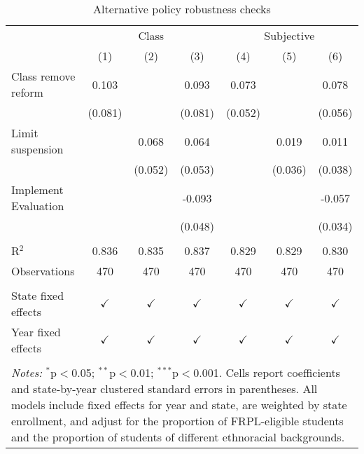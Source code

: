 
\begin{table}[!htbp]
   \centering
   \caption{\label{tab:alt} Alternative policy robustness checks}
   \begin{tabular}{lcccccc}
      \toprule
       & \multicolumn{3}{c}{Class} & \multicolumn{3}{c}{Subjective}\\
                           & (1)           & (2)           & (3)           & (4)           & (5)           & (6)\\
      \midrule 
      Class remove reform  & 0.103         &               & 0.093         & 0.073         &               & 0.078\\
                           & (0.081)       &               & (0.081)       & (0.052)       &               & (0.056)\\
      Limit suspension     &               & 0.068         & 0.064         &               & 0.019         & 0.011\\
                           &               & (0.052)       & (0.053)       &               & (0.036)       & (0.038)\\
      Implement Evaluation &               &               & -0.093        &               &               & -0.057\\
                           &               &               & (0.048)       &               &               & (0.034)\\
      \hline \\[-1.8ex]
      R$^2$                & 0.836         & 0.835         & 0.837         & 0.829         & 0.829         & 0.830\\
      Observations         & 470           & 470           & 470           & 470           & 470           & 470\\
      \hline \\[-1.8ex]
      State fixed effects  & $\checkmark$ & $\checkmark$ & $\checkmark$ & $\checkmark$ & $\checkmark$ & $\checkmark$\\
      Year fixed effects   & $\checkmark$ & $\checkmark$ & $\checkmark$ & $\checkmark$ & $\checkmark$ & $\checkmark$\\
      \bottomrule  \\[-1.8ex]

\multicolumn{7}{l}{
	\begin{minipage}{13cm} \footnotesize \emph{Notes:} $^{*}$p$<$0.05; $^{**}$p$<$0.01; $^{***}$p$<$0.001. Cells report coefficients and state-by-year clustered standard errors in parentheses. All models include fixed effects for year and state, are weighted by state enrollment, and adjust for the proportion of FRPL-eligible students and the proportion of students of different ethnoracial backgrounds.
	\end{minipage}
	} \\
\end{tabular}
\end{table}


